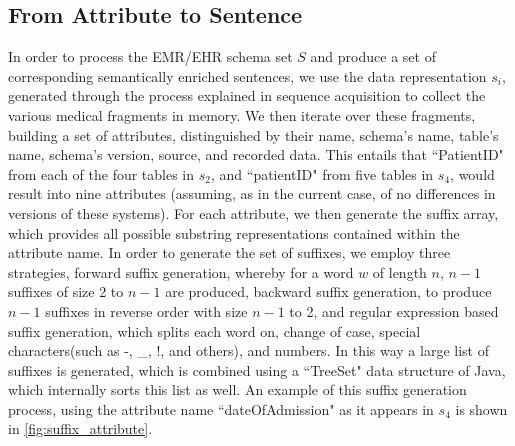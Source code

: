 \documentclass{ieeeaccess}
\begin{document}
\subsection{From Attribute to Sentence}
\label{schema_prepro}
In order to process the EMR/EHR schema set $S$ and produce a set of corresponding semantically enriched sentences, we use the data representation $s_i$, generated through the process explained in sequence acquisition to collect the various medical fragments in memory. We then iterate over these fragments, building a set of attributes, distinguished by their name, schema's name, table's name, schema's version, source, and recorded data. This entails that ``PatientID" from each of the four tables in $s_2$, and ``patientID" from five tables in $s_4$, would result into nine attributes (assuming, as in the current case, of no differences in versions of these systems).
For each attribute, we then generate the suffix array, which provides all possible substring representations contained within the attribute name. In order to generate the set of suffixes, we employ three strategies, forward suffix generation, whereby for a word $w$ of length $n$, $n-1$ suffixes of size 2 to $n-1$ are produced, backward suffix generation, to produce $n-1$ suffixes in reverse order with size $n-1$ to 2, and regular expression based suffix generation, which splits each word on, change of case, special characters(such as -, \_, !, and others), and numbers. In this way a large list of suffixes is generated, which is combined using a ``TreeSet" data structure of Java, which internally sorts this list as well. An example of this suffix generation process, using the attribute name ``dateOfAdmission" as it appears in $s_4$ is shown in \ref{fig:suffix_attribute}.
\end{document}
